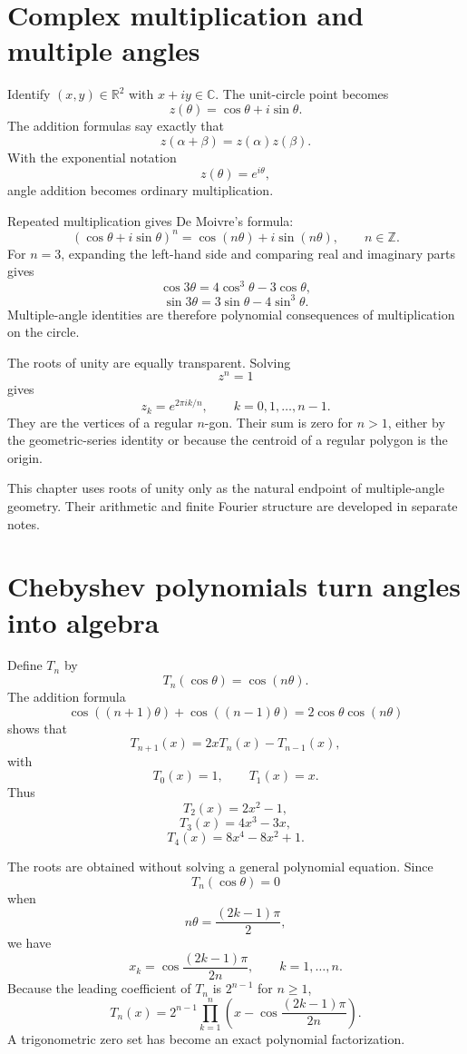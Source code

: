 \section{Complex multiplication and multiple angles}

Identify \((x,y)\in\mathbb R^2\) with \(x+iy\in\mathbb C\).  The unit-circle point becomes
\[
  z(\theta)=\cos\theta+i\sin\theta.
\]
The addition formulas say exactly that
\[
  z(\alpha+\beta)=z(\alpha)z(\beta).
\]
With the exponential notation
\[
  z(\theta)=e^{i\theta},
\]
angle addition becomes ordinary multiplication.

Repeated multiplication gives De Moivre's formula:
\[
  (\cos\theta+i\sin\theta)^n
  =\cos(n\theta)+i\sin(n\theta),
  \qquad n\in\mathbb Z.
\]
For \(n=3\), expanding the left-hand side and comparing real and imaginary parts gives
\[
  \cos3\theta=4\cos^3\theta-3\cos\theta,
\]
\[
  \sin3\theta=3\sin\theta-4\sin^3\theta.
\]
Multiple-angle identities are therefore polynomial consequences of multiplication on the circle.

The roots of unity are equally transparent.  Solving
\[
  z^n=1
\]
gives
\[
  z_k=e^{2\pi i k/n},
  \qquad k=0,1,\ldots,n-1.
\]
They are the vertices of a regular \(n\)-gon.  Their sum is zero for \(n>1\), either by the geometric-series identity or because the centroid of a regular polygon is the origin.

This chapter uses roots of unity only as the natural endpoint of multiple-angle geometry.  Their arithmetic and finite Fourier structure are developed in separate notes.

\section{Chebyshev polynomials turn angles into algebra}

Define \(T_n\) by
\[
  T_n(\cos\theta)=\cos(n\theta).
\]
The addition formula
\[
  \cos((n+1)\theta)+\cos((n-1)\theta)
  =2\cos\theta\cos(n\theta)
\]
shows that
\[
  T_{n+1}(x)=2xT_n(x)-T_{n-1}(x),
\]
with
\[
  T_0(x)=1,
  \qquad
  T_1(x)=x.
\]
Thus
\[
  T_2(x)=2x^2-1,
\]
\[
  T_3(x)=4x^3-3x,
\]
\[
  T_4(x)=8x^4-8x^2+1.
\]

The roots are obtained without solving a general polynomial equation.  Since
\[
  T_n(\cos\theta)=0
\]
when
\[
  n\theta=\frac{(2k-1)\pi}{2},
\]
we have
\[
  x_k=\cos\frac{(2k-1)\pi}{2n},
  \qquad k=1,\ldots,n.
\]
Because the leading coefficient of \(T_n\) is \(2^{n-1}\) for \(n\ge1\),
\[
  T_n(x)
  =2^{n-1}
  \prod_{k=1}^n
  \left(
    x-\cos\frac{(2k-1)\pi}{2n}
  \right).
\]
A trigonometric zero set has become an exact polynomial factorization.

